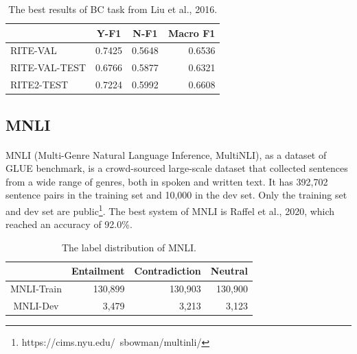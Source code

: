 \documentclass[12pt]{article}
\begin{document}
\begin{CJK*}{UTF8}{bkai}
\begin{spacing}{1.77}
\begin{table}[ht!]
  \centering
  \begin{tabular}{|l|r|r|r|}
  \hline
   & \multicolumn{1}{c|}{Y-F1} & \multicolumn{1}{c|}{N-F1} & \multicolumn{1}{c|}{Macro F1} \\ \hline
  RITE-VAL & 0.7425 & 0.5648 & 0.6536 \\ \hline
  RITE-VAL-TEST & 0.6766 & 0.5877 & 0.6321 \\ \hline
  RITE2-TEST & 0.7224 & 0.5992 & 0.6608 \\ \hline
  \end{tabular}
  \caption{The best results of BC task from Liu et al., 2016.}
  \label{result:bc_liu_2016}
\end{table}

\subsection{MNLI}
\paragraph{}
MNLI (Multi-Genre Natural Language Inference, MultiNLI), as a dataset of GLUE benchmark, is a crowd-sourced large-scale dataset that collected sentences from a wide range of genres, both in spoken and written text. It has 392,702 sentence pairs in the training set and 10,000 in the dev set. Only the training set and dev set are public\footnote{https://cims.nyu.edu/~sbowman/multinli/}. The best system of MNLI is Raffel et al., 2020\cite{raffel2020t5}, which reached an accuracy of 92.0\%.

\begin{table}[ht!]
  \centering
  \begin{tabular}{|c|r|r|r|}
  \hline
  \multicolumn{1}{|l|}{} & \multicolumn{1}{c|}{Entailment} & \multicolumn{1}{c|}{Contradiction} & \multicolumn{1}{c|}{Neutral} \\ \hline
  MNLI-Train & 130,899 & 130,903 & 130,900 \\ \hline
  MNLI-Dev & 3,479 & 3,213 & 3,123 \\ \hline
  \end{tabular}
  \caption{The label distribution of MNLI.}
\end{table}


\end{spacing}
\end{CJK*}
\end{document}

